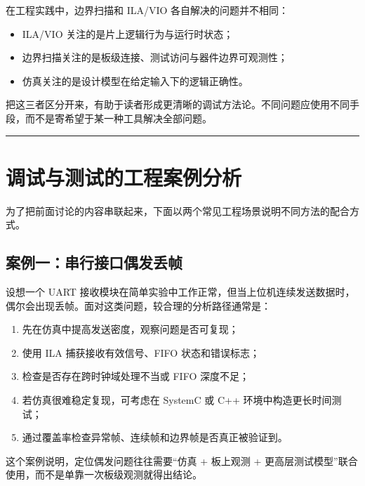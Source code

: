在工程实践中，边界扫描和 ILA/VIO 各自解决的问题并不相同：

\begin{itemize}
\tightlist
\item
  ILA/VIO 关注的是片上逻辑行为与运行时状态；
\item
  边界扫描关注的是板级连接、测试访问与器件边界可观测性；
\item
  仿真关注的是设计模型在给定输入下的逻辑正确性。
\end{itemize}

把这三者区分开来，有助于读者形成更清晰的调试方法论。不同问题应使用不同手段，而不是寄希望于某一种工具解决全部问题。

\begin{center}\rule{0.5\linewidth}{0.5pt}\end{center}

\section{调试与测试的工程案例分析}\label{ux8c03ux8bd5ux4e0eux6d4bux8bd5ux7684ux5de5ux7a0bux6848ux4f8bux5206ux6790}

为了把前面讨论的内容串联起来，下面以两个常见工程场景说明不同方法的配合方式。

\subsection{案例一：串行接口偶发丢帧}\label{ux6848ux4f8bux4e00ux4e32ux884cux63a5ux53e3ux5076ux53d1ux4e22ux5e27}

设想一个 UART
接收模块在简单实验中工作正常，但当上位机连续发送数据时，偶尔会出现丢帧。面对这类问题，较合理的分析路径通常是：

\begin{enumerate}
\def\labelenumi{\arabic{enumi}.}
\tightlist
\item
  先在仿真中提高发送密度，观察问题是否可复现；
\item
  使用 ILA 捕获接收有效信号、FIFO 状态和错误标志；
\item
  检查是否存在跨时钟域处理不当或 FIFO 深度不足；
\item
  若仿真很难稳定复现，可考虑在 SystemC 或 C++ 环境中构造更长时间测试；
\item
  通过覆盖率检查异常帧、连续帧和边界帧是否真正被验证到。
\end{enumerate}

这个案例说明，定位偶发问题往往需要``仿真 + 板上观测 +
更高层测试模型''联合使用，而不是单靠一次板级观测就得出结论。

